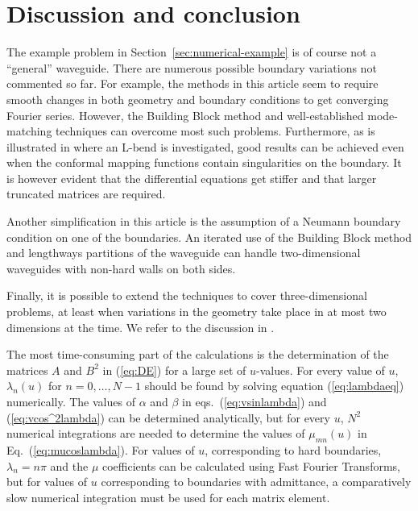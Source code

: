 \documentclass[numreferences]{kluwer}
\renewcommand{\Re}{\operatorname{Re}}
\begin{document}







\section{Discussion and conclusion}
\label{sec:conclusion}

The example problem in Section~\ref{sec:numerical-example} is of
course not a ``general'' wave\-guide. There are numerous possible
boundary variations not commented so far. For example, the methods in
this article seem to require smooth changes in both geometry and
boundary conditions to get converging Fourier series. However, the
Building Block method and well-established mode-matching techniques
can overcome most such problems. Furthermore, as is illustrated in
\cite{Nilsson:2002} where an L-bend is investigated, good results can
be achieved even when the conformal mapping functions contain
singularities on the boundary. It is however evident that the
differential equations get stiffer and that larger truncated matrices
are required.

Another simplification in this article is the assumption of a Neumann
boundary condition on one of the boundaries. An iterated use of the
Building Block method and lengthways partitions of the waveguide can
handle two-dimensional waveguides with non-hard walls on both sides.

Finally, it is possible to extend the techniques to cover
three-dimensional problems, at least when variations in the geometry
take place in at most two dimensions at the time. We refer to the
discussion in \cite{Nilsson:2002}.

The most time-consuming part of the calculations is the determination
of the matrices $A$ and $B^2$ in (\ref{eq:DE}) for a large set of
$u$-values. For every value of $u$, $\lambda_n(u)$ for $n=0,\dots,N-1$
should be found by solving equation (\ref{eq:lambdaeq}) numerically.
The values of $\alpha$ and $\beta$ in eqs.~(\ref{eq:vsinlambda}) and
(\ref{eq:vcos^2lambda}) can be determined analytically, but for every
$u$, $N^2$ numerical integrations are needed to determine the values
of $\mu_{mn}(u)$ in Eq.~(\ref{eq:mucoslambda}). For values of $u$,
corresponding to hard boundaries, $\lambda_n=n\pi$ and the $\mu$
coefficients can be calculated using Fast Fourier Transforms, but for
values of $u$ corresponding to boundaries with admittance, a
comparatively slow numerical integration must be used for each matrix
element.
\end{document}

